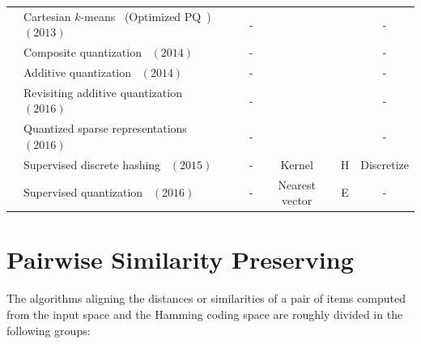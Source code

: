 \documentclass[10pt,journal,compsoc]{IEEEtran}
\begin{document}
\begin{table}[t]
\begin{tabular}{|@{~}c@{~}|@{~}l@{~}||@{~}c@{~}|@{~}c@{~}|@{~}c@{~}||@{~}c@{~}||@{~}c@{~}|}
& Cartesian $k$-means~\cite{NorouziF13} (Optimized PQ~\cite{GeHK013}) $(2013)$ &   & -  &  & & -\\
& Composite quantization~\cite{ZhangDW14} $(2014)$ &   &  -  &  &  &-\\
& {Additive quantization~\cite{BabenkoK14}} $(2014)$ &   &  -  &  &  &-\\
& {Revisiting additive quantization~\cite{MartinezCHL16}} $(2016)$ &   &  -  &  &  &-\\
& {Quantized sparse representations~\cite{JainPGZJ16}} $(2016)$ &   &  -  &  &  &-\\
\cline{2-7}
 &
  Supervised discrete hashing~\cite{ShenSLS15} $(2015)$ & {\multirow{2}{*}{\rotatebox[origin=c]{0}{$||\mathbf{x}-\mathbf{y}||_2$}}} &  -   & Kernel  & H & Discretize \\
  &
  Supervised quantization~\cite{WangZQTW16} $(2016)$ & &  -   & Nearest vector & E & - \\
\hline
\end{tabular}\vspace{-.3cm}
\end{table}

\section{Pairwise Similarity Preserving}
\label{sec:pairwise}
The algorithms aligning the distances or similarities
of a pair of items
computed from the input space and the Hamming coding space
are roughly divided in the following groups:
\end{document}

